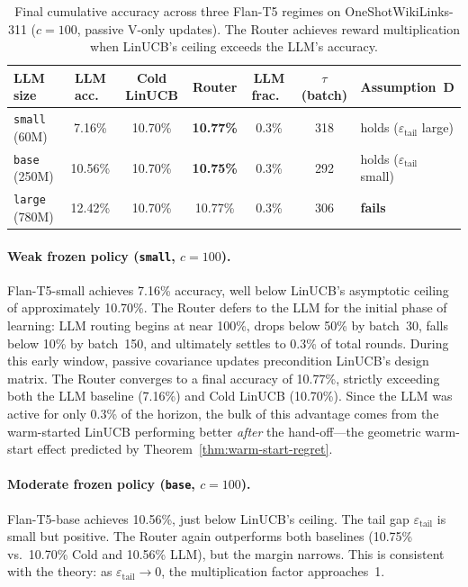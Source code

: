 \begin{table}[h]
\centering
\caption{Final cumulative accuracy across three Flan-T5 regimes on OneShotWikiLinks-311 ($c=100$, passive V-only updates). The Router achieves reward multiplication when LinUCB's ceiling exceeds the LLM's accuracy.}
\label{tab:v1-results}
\begin{tabular}{@{}lcccccl@{}}
\toprule
LLM size & LLM acc.\ & Cold LinUCB & Router & LLM frac.\ & $\tau$ (batch) & Assumption~D \\
\midrule
\texttt{small}\,(60M) & 7.16\% & 10.70\% & \textbf{10.77\%} & 0.3\% & 318 & holds ($\varepsilon_{\mathrm{tail}}$ large) \\
\texttt{base}\,(250M) & 10.56\% & 10.70\% & \textbf{10.75\%} & 0.3\% & 292 & holds ($\varepsilon_{\mathrm{tail}}$ small) \\
\texttt{large}\,(780M) & 12.42\% & 10.70\% & 10.77\% & 0.3\% & 306 & \textbf{fails} \\
\bottomrule
\end{tabular}
\end{table}

\paragraph{Weak frozen policy (\texttt{small}, $c=100$).}
Flan-T5-small achieves 7.16\% accuracy, well below LinUCB's asymptotic ceiling of approximately 10.70\%. The Router defers to the LLM for the initial phase of learning: LLM routing begins at near 100\%, drops below 50\% by batch~30, falls below 10\% by batch~150, and ultimately settles to 0.3\% of total rounds. During this early window, passive covariance updates precondition LinUCB's design matrix. The Router converges to a final accuracy of 10.77\%, strictly exceeding both the LLM baseline (7.16\%) and Cold LinUCB (10.70\%). Since the LLM was active for only 0.3\% of the horizon, the bulk of this advantage comes from the warm-started LinUCB performing better \emph{after} the hand-off---the geometric warm-start effect predicted by Theorem~\ref{thm:warm-start-regret}.

\paragraph{Moderate frozen policy (\texttt{base}, $c=100$).}
Flan-T5-base achieves 10.56\%, just below LinUCB's ceiling. The tail gap $\varepsilon_{\mathrm{tail}}$ is small but positive. The Router again outperforms both baselines (10.75\% vs.\ 10.70\% Cold and 10.56\% LLM), but the margin narrows. This is consistent with the theory: as $\varepsilon_{\mathrm{tail}} \to 0$, the multiplication factor approaches~1.

